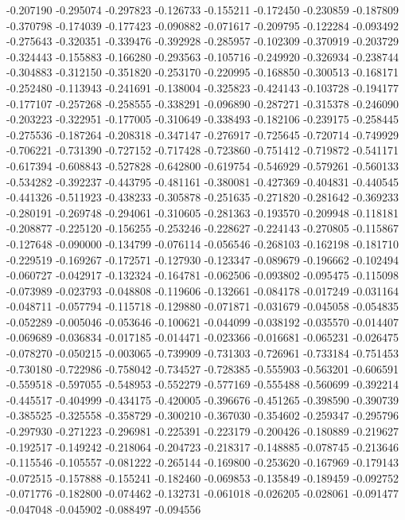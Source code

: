 -0.207190
-0.295074
-0.297823
-0.126733
-0.155211
-0.172450
-0.230859
-0.187809
-0.370798
-0.174039
-0.177423
-0.090882
-0.071617
-0.209795
-0.122284
-0.093492
-0.275643
-0.320351
-0.339476
-0.392928
-0.285957
-0.102309
-0.370919
-0.203729
-0.324443
-0.155883
-0.166280
-0.293563
-0.105716
-0.249920
-0.326934
-0.238744
-0.304883
-0.312150
-0.351820
-0.253170
-0.220995
-0.168850
-0.300513
-0.168171
-0.252480
-0.113943
-0.241691
-0.138004
-0.325823
-0.424143
-0.103728
-0.194177
-0.177107
-0.257268
-0.258555
-0.338291
-0.096890
-0.287271
-0.315378
-0.246090
-0.203223
-0.322951
-0.177005
-0.310649
-0.338493
-0.182106
-0.239175
-0.258445
-0.275536
-0.187264
-0.208318
-0.347147
-0.276917
-0.725645
-0.720714
-0.749929
-0.706221
-0.731390
-0.727152
-0.717428
-0.723860
-0.751412
-0.719872
-0.541171
-0.617394
-0.608843
-0.527828
-0.642800
-0.619754
-0.546929
-0.579261
-0.560133
-0.534282
-0.392237
-0.443795
-0.481161
-0.380081
-0.427369
-0.404831
-0.440545
-0.441326
-0.511923
-0.438233
-0.305878
-0.251635
-0.271820
-0.281642
-0.369233
-0.280191
-0.269748
-0.294061
-0.310605
-0.281363
-0.193570
-0.209948
-0.118181
-0.208877
-0.225120
-0.156255
-0.253246
-0.228627
-0.224143
-0.270805
-0.115867
-0.127648
-0.090000
-0.134799
-0.076114
-0.056546
-0.268103
-0.162198
-0.181710
-0.229519
-0.169267
-0.172571
-0.127930
-0.123347
-0.089679
-0.196662
-0.102494
-0.060727
-0.042917
-0.132324
-0.164781
-0.062506
-0.093802
-0.095475
-0.115098
-0.073989
-0.023793
-0.048808
-0.119606
-0.132661
-0.084178
-0.017249
-0.031164
-0.048711
-0.057794
-0.115718
-0.129880
-0.071871
-0.031679
-0.045058
-0.054835
-0.052289
-0.005046
-0.053646
-0.100621
-0.044099
-0.038192
-0.035570
-0.014407
-0.069689
-0.036834
-0.017185
-0.014471
-0.023366
-0.016681
-0.065231
-0.026475
-0.078270
-0.050215
-0.003065
-0.739909
-0.731303
-0.726961
-0.733184
-0.751453
-0.730180
-0.722986
-0.758042
-0.734527
-0.728385
-0.555903
-0.563201
-0.606591
-0.559518
-0.597055
-0.548953
-0.552279
-0.577169
-0.555488
-0.560699
-0.392214
-0.445517
-0.404999
-0.434175
-0.420005
-0.396676
-0.451265
-0.398590
-0.390739
-0.385525
-0.325558
-0.358729
-0.300210
-0.367030
-0.354602
-0.259347
-0.295796
-0.297930
-0.271223
-0.296981
-0.225391
-0.223179
-0.200426
-0.180889
-0.219627
-0.192517
-0.149242
-0.218064
-0.204723
-0.218317
-0.148885
-0.078745
-0.213646
-0.115546
-0.105557
-0.081222
-0.265144
-0.169800
-0.253620
-0.167969
-0.179143
-0.072515
-0.157888
-0.155241
-0.182460
-0.069853
-0.135849
-0.189459
-0.092752
-0.071776
-0.182800
-0.074462
-0.132731
-0.061018
-0.026205
-0.028061
-0.091477
-0.047048
-0.045902
-0.088497
-0.094556
